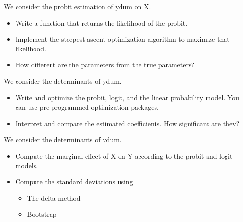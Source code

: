 \documentclass[10pt,a4paper]{article}
\newcommand{\1}{\mathds{1}}
\begin{document}
\begin{Exercise}[title=Numerical Optimization]
We consider the probit estimation of ydum on X. 
\begin{itemize}
\item Write a function that returns the likelihood of the probit.
\item Implement the steepest ascent optimization algorithm to maximize that likelihood.
\item How different are the parameters from the true parameters?
\end{itemize}
\end{Exercise}

\begin{Exercise}[title=Discrete choice]
We consider the determinants of ydum. 
\begin{itemize}
\item Write and optimize the probit, logit, and the linear probability model. You can use pre-programmed optimization packages.
\item Interpret and compare the estimated coefficients. How significant are they?
\end{itemize}
\end{Exercise}

\begin{Exercise}[title=Marginal Effects]
We consider the determinants of ydum. 
\begin{itemize}
\item Compute the marginal effect of X on Y according to the probit and logit models.
\item Compute the standard deviations using
\begin{itemize}
\item The delta method
\item Bootstrap
\end{itemize}
\end{itemize}
\end{Exercise}
\end{document}
